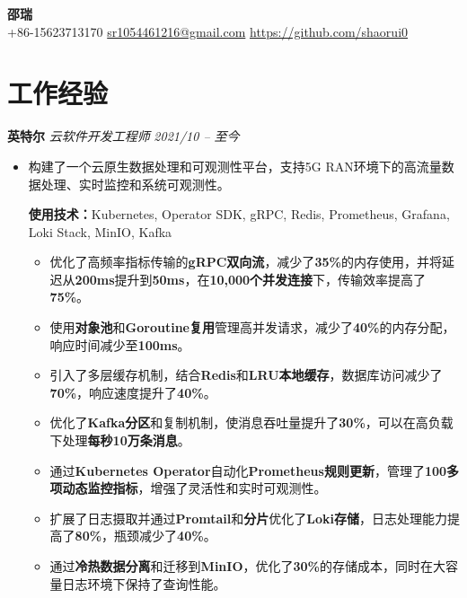 \documentclass[a4paper,10pt]{article}
\begin{document}
\begin{CJK}{UTF8}{gbsn} %
\begin{center}
    \textbf{\Huge 邵瑞} \\[0.5em]
    +86-15623713170 \textbar \href{mailto:sr1054461216@gmail.com}{sr1054461216@gmail.com} \textbar \href{https://github.com/shaorui0}{https://github.com/shaorui0}
\end{center}

\section*{工作经验}

\noindent\textbf{英特尔} \hfill \textit{云软件开发工程师} \hfill \textit{2021/10 -- 至今}
\begin{itemize}[leftmargin=*,noitemsep]

    \item 构建了一个云原生数据处理和可观测性平台，支持5G RAN环境下的高流量数据处理、实时监控和系统可观测性。

    \textbf{使用技术：}Kubernetes, Operator SDK, gRPC, Redis, Prometheus, Grafana, Loki Stack, MinIO, Kafka
    \begin{itemize}[noitemsep]
        \item 优化了高频率指标传输的\textbf{gRPC双向流}，减少了\textbf{35\%}的内存使用，并将延迟从\textbf{200ms}提升到\textbf{50ms}，在\textbf{10,000个并发连接}下，传输效率提高了\textbf{75\%}。
        \item 使用\textbf{对象池}和\textbf{Goroutine复用}管理高并发请求，减少了\textbf{40\%}的内存分配，响应时间减少至\textbf{100ms}。
        \item 引入了多层缓存机制，结合\textbf{Redis}和\textbf{LRU本地缓存}，数据库访问减少了\textbf{70\%}，响应速度提升了\textbf{40\%}。
        \item 优化了\textbf{Kafka分区}和复制机制，使消息吞吐量提升了\textbf{30\%}，可以在高负载下处理\textbf{每秒10万条消息}。
        \item 通过\textbf{Kubernetes Operator}自动化\textbf{Prometheus规则更新}，管理了\textbf{100多项动态监控指标}，增强了灵活性和实时可观测性。
        \item 扩展了日志摄取并通过\textbf{Promtail}和\textbf{分片}优化了\textbf{Loki存储}，日志处理能力提高了\textbf{80\%}，瓶颈减少了\textbf{40\%}。
        \item 通过\textbf{冷热数据分离}和迁移到\textbf{MinIO}，优化了\textbf{30\%}的存储成本，同时在大容量日志环境下保持了查询性能。
    \end{itemize}


\end{itemize}
\end{CJK}
\end{document}
